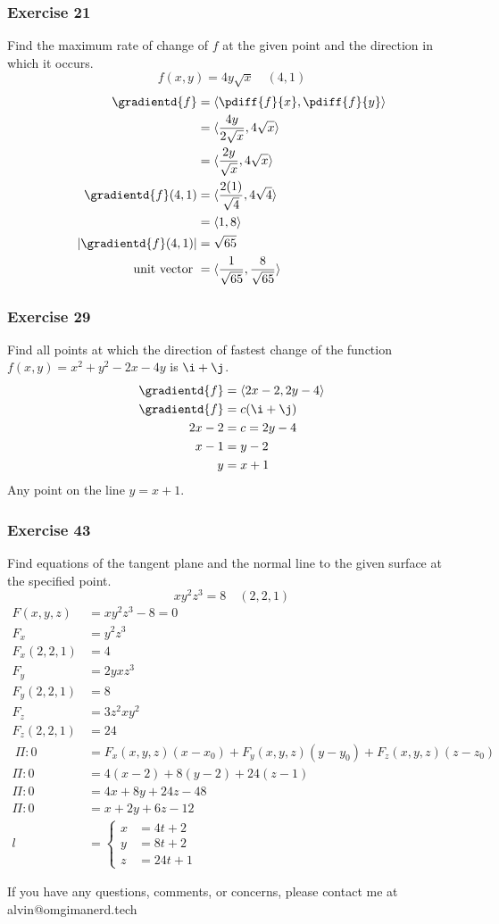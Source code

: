\documentclass{math}
\begin{document}
\subsubsection*{Exercise 21}
Find the maximum rate of change of \( f \) at the given point and the direction
in which it occurs.
\[ f(x,y) = 4y\sqrt{x} \quad (4,1) \]
\begin{align*}
  \gradientd{f} &= \langle\pdiff{f}{x},\pdiff{f}{y}\rangle \\
  &= \langle\frac{4y}{2\sqrt{x}},4\sqrt{x}\rangle \\
  &= \langle\frac{2y}{\sqrt{x}},4\sqrt{x}\rangle \\
  \gradientd{f}(4,1) &= \langle\frac{2(1)}{\sqrt{4}},4\sqrt{4}\rangle \\
  &= \langle1,8\rangle \\
  |\gradientd{f}(4,1)| &= \sqrt{65} \\
  \text{unit vector } &= \langle\frac{1}{\sqrt{65}},\frac{8}{\sqrt{65}}\rangle
\end{align*}

\subsubsection*{Exercise 29}
Find all points at which the direction of fastest change of the function
\( f(x,y) = x^2+y^2-2x-4y \) is \( \i+\j \).
\begin{align*}
  \gradientd{f} &= \langle2x-2,2y-4\rangle \\
  \gradientd{f} &= c(\i+\j) \\
  2x-2 &= c = 2y-4 \\
  x-1 &= y-2 \\
  y &= x+1
\end{align*}
Any point on the line \( y = x+1 \).

\subsubsection*{Exercise 43}
Find equations of the tangent plane and the normal line to the given surface
at the specified point.
\[ xy^2z^3 = 8 \quad (2,2,1) \]
\begin{align*}
  F(x,y,z) &= xy^2z^3-8 = 0 \\
  F_x &= y^2z^3 \\
  F_x(2,2,1) &= 4 \\
  F_y &= 2yxz^3 \\
  F_y(2,2,1) &= 8 \\
  F_z &= 3z^2xy^2 \\
  F_z(2,2,1) &= 24 \\\
  \Pi: 0 &= F_x(x,y,z)(x-x_0)+F_y(x,y,z)(y-y_0)+F_z(x,y,z)(z-z_0) \\
  \Pi: 0 &= 4(x-2)+8(y-2)+24(z-1) \\
  \Pi: 0 &= 4x+8y+24z-48 \\
  \Pi: 0 &= x+2y+6z-12 \\
  l &= \begin{cases}
    x &= 4t+2 \\
    y &= 8t+2 \\
    z &= 24t+1
  \end{cases}
\end{align*}

\begin{center}
  If you have any questions, comments, or concerns, please contact me at
  alvin@omgimanerd.tech
\end{center}
\end{document}
